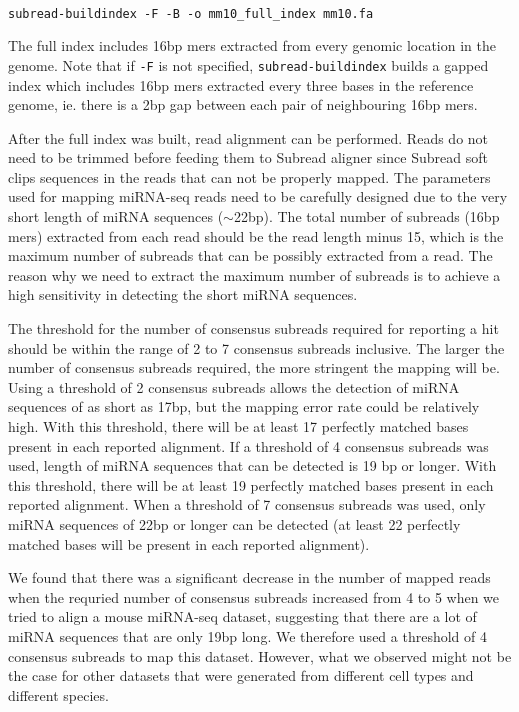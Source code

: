 \documentclass[12pt]{report}
\newcommand{\code}[1]{{\small\texttt{#1}}}
\newcommand{\Subread}{\textsf{Subread}}
\begin{document}
\code{\\
subread-buildindex -F -B -o mm10\_full\_index mm10.fa \\
}

The full index includes 16bp mers extracted from every genomic location in the genome.
Note that if \code{-F} is not specified, \code{subread-buildindex} builds a gapped index which includes 16bp mers extracted every three bases in the reference genome, ie. there is a 2bp gap between each pair of neighbouring 16bp mers.

After the full index was built, read alignment can be performed.
Reads do not need to be trimmed before feeding them to {\Subread} aligner since {\Subread} soft clips sequences in the reads that can not be properly mapped.
The parameters used for mapping miRNA-seq reads need to be carefully designed due to the very short length of miRNA sequences ($\sim$22bp).
The total number of subreads (16bp mers) extracted from each read should be the read length minus 15, which
is the maximum number of subreads that can be possibly extracted from a read.
The reason why we need to extract the maximum number of subreads is to achieve a high sensitivity in detecting the short miRNA sequences.

The threshold for the number of consensus subreads required for reporting a hit should be within the range of 2 to 7 consensus subreads inclusive.
The larger the number of consensus subreads required, the more stringent the mapping will be.
Using a threshold of 2 consensus subreads allows the detection of miRNA sequences of as short as 17bp, but the mapping error rate could be relatively high.
With this threshold, there will be at least 17 perfectly matched bases present in each reported alignment.
If a threshold of 4 consensus subreads was used, length of miRNA sequences that can be detected is 19 bp or longer.
With this threshold, there will be at least 19 perfectly matched bases present in each reported alignment.
When a threshold of 7 consensus subreads was used, only miRNA sequences of 22bp or longer can be detected (at least 22 perfectly matched bases will be present in each reported alignment).

We found that there was a significant decrease in the number of mapped reads when the requried number of consensus subreads increased from 4 to 5 when we tried to align a mouse miRNA-seq dataset, suggesting that there are a lot of miRNA sequences that are only 19bp long.
We therefore used a threshold of 4 consensus subreads to map this dataset.
However, what we observed might not be the case for other datasets that were generated from different cell types and different species.
\end{document}
